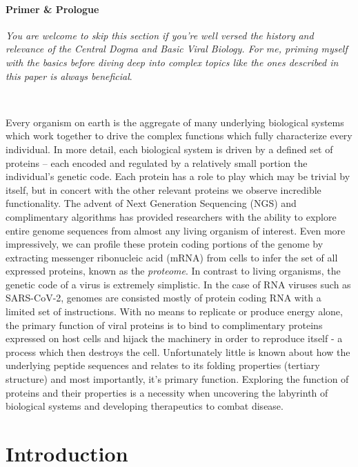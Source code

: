 \documentclass{article}
\begin{document}
\paragraph{Primer \& Prologue}
\textit{You are welcome to skip this section if you're well versed the history and relevance of the Central Dogma and Basic Viral Biology. 
For me, priming myself with the basics before diving deep into complex topics like the ones described in this paper is always beneficial}.

~

Every organism on earth is the aggregate of many underlying biological systems which work together to drive the complex functions which fully characterize every individual.
In more detail, each biological system is driven by a defined set of proteins -- each encoded and regulated by a relatively small portion the individual's genetic code.
Each protein has a role to play which may be trivial by itself, but in concert with the other relevant proteins we observe incredible functionality. 
The advent of Next Generation Sequencing (NGS) and complimentary algorithms has provided researchers with the ability to explore entire genome sequences from almost any living organism of interest.
Even more impressively, we can profile these protein coding portions of the genome by extracting messenger ribonucleic acid (mRNA) from cells to infer the set of all expressed proteins, known as the \textit{proteome}. 
In contrast to living organisms, the genetic code of a virus is extremely simplistic. 
In the case of RNA viruses such as SARS-CoV-2, genomes are consisted mostly of protein coding RNA with a limited set of instructions.
With no means to replicate or produce energy alone, the primary function of viral proteins is to bind to complimentary proteins expressed on host cells and hijack the machinery in order to reproduce itself - a process which then destroys the cell.
Unfortunately little is known about how the underlying peptide sequences and relates to its folding properties (tertiary structure) and most importantly, it's primary function.
Exploring the function of proteins and their properties is a necessity when uncovering the labyrinth of biological systems and developing therapeutics to combat disease.

\section*{Introduction}
\end{document}
